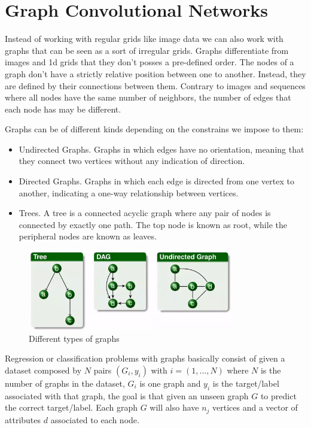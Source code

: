 \chapter{Graph Convolutional Networks}

Instead of working with regular grids like image data we can also work with graphs that can be seen as a sort of irregular grids. Graphs differentiate from images and 1d grids that they don't posses a pre-defined order. The nodes of a graph don't have a strictly relative position between one to another. Instead, they are defined by their connections between them. Contrary to images and sequences where all nodes have the same number of neighbors, the number of edges that each node has may be different.

\noindent Graphs can be of different kinds depending on the constrains we impose to them:

\begin{itemize}
    \item Undirected Graphs. Graphs in which edges have no orientation, meaning that they connect two vertices without any indication of direction.
    \item Directed Graphs. Graphs in which each edge is directed from one vertex to another, indicating a one-way relationship between vertices.
    \item Trees. A tree is a connected acyclic graph where any pair of nodes is connected by exactly one path. The top node is known as root, while the peripheral nodes are known as leaves.
\end{itemize}

\begin{figure}[h]
    \centering
    \includegraphics[width=9cm]{Images/types-graphs.png}
    \caption{Different types of graphs}
\end{figure}

\noindent Regression or classification problems with graphs basically consist of given a dataset composed by $N$ pairs $\left ( G_i, y_i \right)$ with $i = (1, ..., N)$ where $N$ is the number of graphs in the dataset, $G_i$ is one graph and $y_i$ is the target/label associated with that graph, the goal is that given an unseen graph $G$ to predict the correct target/label. Each graph $G$ will also have $n_j$ vertices and a vector of attributes $d$ associated to each node.


